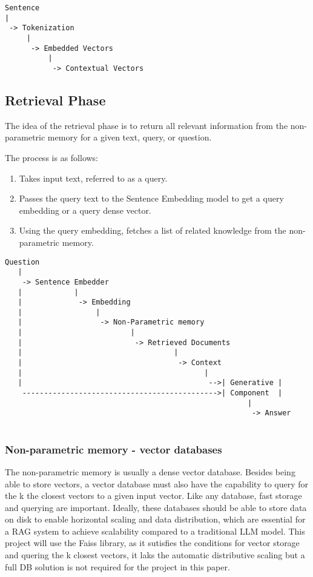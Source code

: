 \documentclass[11pt]{wseas}
\begin{document}
\begin{verbatim}
Sentence
|
 -> Tokenization
     |
      -> Embedded Vectors
          |
           -> Contextual Vectors
\end{verbatim}

\newpage

\subsection{Retrieval Phase}\label{retrieval-phase}

The idea of the retrieval phase is to return all relevant information
from the non-parametric memory for a given text, query, or question.

The process is as follows:

\begin{enumerate}
  \item
  Takes input text, referred to as a query.
  \item
  Passes the query text to the Sentence Embedding model to get a query
  embedding or a query dense vector.
  \item
  Using the query embedding, fetches a list of related knowledge from
  the non-parametric memory.
\end{enumerate}

\begin{verbatim}
Question 
   |
    -> Sentence Embedder 
   |            | 
   |             -> Embedding 
   |                 |
   |                  -> Non-Parametric memory 
   |                         |
   |                          -> Retrieved Documents
   |                                   |
   |                                    -> Context
   |                                          | 
   |                                           -->| Generative |
    --------------------------------------------->| Component  |
                                                        |
                                                         -> Answer
                                            
\end{verbatim}

    \subsubsection{Non-parametric memory - vector
databases}\label{non-parametric-memory---vector-databases}

The non-parametric memory is usually a dense vector database. Besides
being able to store vectors, a vector database must also have the
capability to query for the k the closest vectors to a given input
vector. Like any database, fast storage and querying are important.
Ideally, these databases should be able to store data on disk to enable
horizontal scaling and data distribution, which are essential for a RAG
system to achieve scalability compared to a traditional LLM model. This
project will use the Faiss library, as it sutisfies the conditions for
vector storage and quering the k closest vectors, it laks the automatic
distributive scaling but a full DB solution is not required for the
project in this paper.
\end{document}
